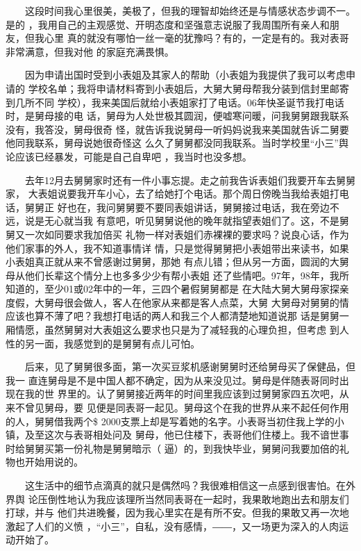 \documentclass[12pt]{book}
\begin{document}
　　这段时间我心里很美，美极了，但我的理智却始终还是与情感状态步调不一。是的
，我用自己的主观感觉、开明态度和坚强意志说服了我周围所有亲人和朋友，但我心里
真的就没有哪怕一丝一毫的犹豫吗？有的，一定是有的。我对表哥非常满意，但我对他
的家庭充满畏惧。

　　因为申请出国时受到小表姐及其家人的帮助（小表姐为我提供了我可以考虑申请的
学校名单；我将申请材料寄到小表姐后，大舅大舅母帮我分装到信封里邮寄到几所不同
学校），我来美国后就给小表姐家打了电话。06年快圣诞节我打电话时，是舅母接的电
话，舅母为人处世极其圆润，便嘘寒问暖，问我舅舅跟我联系没有，我答没，舅母很奇
怪，就告诉我说舅母一听妈妈说我来美国就告诉二舅要他同我联系，舅母说她很奇怪这
么久了舅舅都没同我联系。当时学校里“小三”舆论应该已经暴发，可能是自己自卑吧
，我当时也没多想。

　　去年12月去舅舅家时还有一件小事忘提。走之前我告诉表姐们我要开车去舅舅家，
大表姐说要我开车小心，去了给她打个电话。那个周日傍晚当我给表姐打电话，舅舅正
好也在，我问舅舅要不要同表姐讲话，舅舅接过电话，我在旁边不远，说是无心就当我
有意吧，听见舅舅说他的晚年就指望表姐们了。这，不是舅舅又一次如同要求我加倍买
礼物一样对表姐们赤裸裸的要求吗？说良心话，作为他们家事的外人，我不知道事情详
情，只是觉得舅舅把小表姐带出来读书，如果小表姐真正就从来不曾感谢过舅舅，那她
有点儿错；但从另一方面，圆润的大舅母从他们长辈这个情分上也多多少少有帮小表姐
还了些情吧。97年，98年，我所知道的，至少01或02年中的一年，三四个暑假舅舅都是
在大陆大舅大舅母家探亲度假，大舅母很会做人，客人在他家从来都是客人点菜，大舅
大舅母对舅舅的情应该也算不薄了吧？我想打电话的两人和我三个人都清楚地知道说那
话是舅舅一厢情愿，虽然舅舅对大表姐这么要求也只是为了减轻我的心理负担，但考虑
到人性的另一面，我感觉到的是舅舅有点儿可怕。

　　后来，见了舅舅很多面，第一次买豆浆机感谢舅舅时还给舅母买了保健品，但我一
直连舅母是不是中国人都不确定，因为从来没见过。舅母是伴随表哥同时出现在我的世
界里的。认了舅舅接近两年的时间里我应该到过舅舅家四五次吧，从来不曾见舅母，要
见便是同表哥一起见。舅母这个在我的世界从来不起任何作用的人，舅舅借我两个\$
2000支票上却是写着她的名字。小表哥当初住我上学的小镇，及至这次与表哥相处问及
舅母，他已住楼下，表哥他们住楼上。我不谙世事时给舅舅买第一份礼物是舅舅暗示（
逼）的，到我快毕业，舅舅问我要加倍的礼物也开始用说的。

　　这生活中的细节点滴真的就只是偶然吗？我很难相信这一点感到很害怕。在外界舆
论压倒性地认为我应该理所当然同表哥在一起时，我果敢地跑出去和朋友们打球，并与
他们共进晚餐，因为我心里实在是有所不安。但我的果敢又再一次地激起了人们的义愤
，“小三”，自私，没有感情，――，又一场更为深入的人肉运动开始了。
\end{document}
